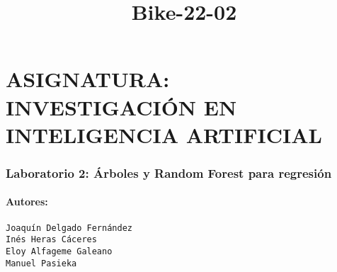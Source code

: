 \documentclass[11pt]{article}
\title{Bike-22-02}
\begin{document}
    
    
    \maketitle
    
    

    
    \hypertarget{asignatura-investigaciuxf3n-en-inteligencia-artificial}{%
\section{ASIGNATURA: INVESTIGACIÓN EN INTELIGENCIA
ARTIFICIAL}\label{asignatura-investigaciuxf3n-en-inteligencia-artificial}}

\hypertarget{laboratorio-2-uxe1rboles-y-random-forest-para-regresiuxf3n}{%
\subsubsection{Laboratorio 2: Árboles y Random Forest para
regresión}\label{laboratorio-2-uxe1rboles-y-random-forest-para-regresiuxf3n}}

    \hypertarget{autores}{%
\paragraph{Autores:}\label{autores}}

\begin{verbatim}
Joaquín Delgado Fernández
Inés Heras Cáceres
Eloy Alfageme Galeano 
Manuel Pasieka
\end{verbatim}
\end{document}
